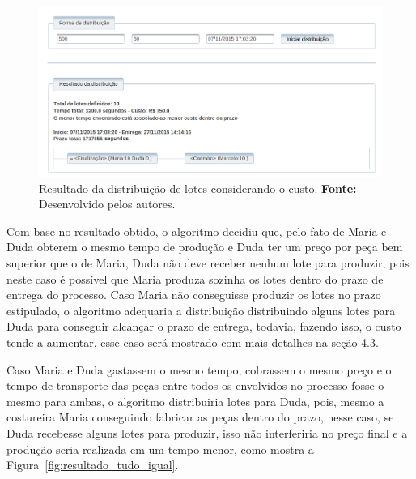 \begin{figure}[h!]
	\centerline{\includegraphics[width=13cm]{./imagens/resultado_teste2.png}}
	\caption[Resultado da distribuição de lotes considerando o custo.]
	{Resultado da distribuição de lotes considerando o custo. \textbf{Fonte:}
	Desenvolvido pelos autores.}
	\label{fig:resultado_custo}
\end{figure}

\par Com base no resultado obtido, o algoritmo decidiu que, pelo fato de
Maria e Duda obterem o mesmo tempo de produção e Duda ter um preço por peça
bem superior que o de Maria, Duda não deve receber nenhum lote para produzir, pois neste
caso é possível que Maria produza sozinha os lotes dentro do prazo de entrega do
processo. Caso Maria não conseguisse produzir os lotes no prazo estipulado, o
algoritmo adequaria a distribuição distribuindo alguns lotes para Duda para
conseguir alcançar o prazo de entrega, todavia, fazendo isso, o custo tende a
aumentar, esse caso será mostrado com mais detalhes na seção 4.3.

\par Caso Maria e Duda gastassem o mesmo tempo, cobrassem o mesmo preço e o tempo de
transporte das peças entre todos os envolvidos no processo fosse o mesmo para ambas, 
o algoritmo distribuiria lotes para Duda, pois, mesmo a costureira Maria
conseguindo fabricar as peças dentro do prazo, nesse caso, se Duda recebesse
alguns lotes para produzir, isso não interferiria no preço final e a produção
seria realizada em um tempo menor, como mostra a
Figura~\ref{fig:resultado_tudo_igual}.

